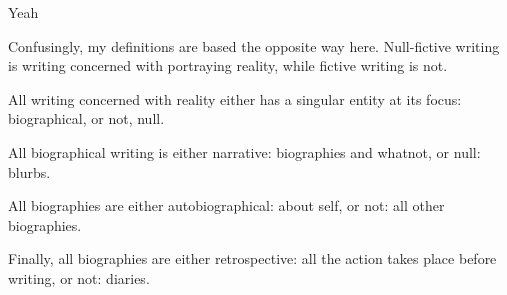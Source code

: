 Yeah \documentclass[12pt]{article}[titlepage]
\newcommand{\1}{\={a}}
\newcommand{\2}{\={e}}
\newcommand{\3}{\={\i}}
\newcommand{\4}{\=o}
\newcommand{\5}{\=u}
\newcommand{\6}{\={A}}
\renewcommand{\,}{\textsuperscript{,}}
\begin{document}
Confusingly, my definitions are based the opposite way here.
Null-fictive writing is writing concerned with portraying reality, while fictive writing is not.

All writing concerned with reality either has a singular entity at its focus: biographical, or not, null.

All biographical writing is either narrative: biographies and whatnot, or null: blurbs.

All biographies are either autobiographical: about self, or not: all other biographies.

Finally, all biographies are either retrospective: all the action takes place before writing, or not: diaries.
\end{document}
